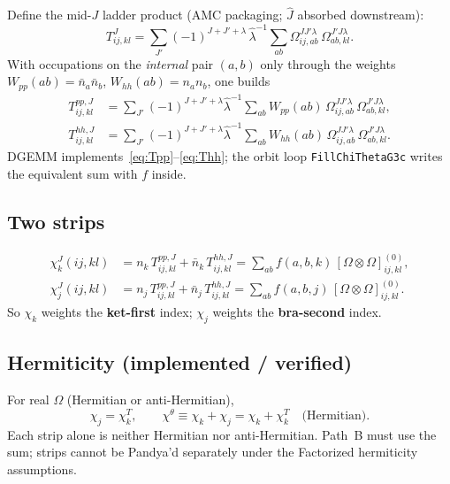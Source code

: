 \documentclass[11pt]{article}
\newcommand{\Jhat}[1]{\widehat{#1}}
\newcommand{\nbar}{\bar n}
\begin{document}
Define the mid-$J$ ladder product (AMC packaging; $\Jhat{J}$ absorbed downstream):
\begin{equation}
T^{J}_{ij,kl}
=\sum_{J'}(-1)^{J+J'+\lambda}\,\hat\lambda^{-1}
\sum_{ab}
\Omega^{JJ'\lambda}_{ij,ab}\,
\Omega^{J'J\lambda}_{ab,kl}.
\label{eq:T}
\end{equation}
With occupations on the \emph{internal} pair $(a,b)$ only through the weights
$W_{pp}(ab)=\nbar_a\nbar_b$, $W_{hh}(ab)=n_a n_b$, one builds
\begin{align}
T^{pp,J}_{ij,kl}
&=\sum_{J'}(-1)^{J+J'+\lambda}\hat\lambda^{-1}
\sum_{ab} W_{pp}(ab)\,
\Omega^{JJ'\lambda}_{ij,ab}\,\Omega^{J'J\lambda}_{ab,kl},
\label{eq:Tpp}\\
T^{hh,J}_{ij,kl}
&=\sum_{J'}(-1)^{J+J'+\lambda}\hat\lambda^{-1}
\sum_{ab} W_{hh}(ab)\,
\Omega^{JJ'\lambda}_{ij,ab}\,\Omega^{J'J\lambda}_{ab,kl}.
\label{eq:Thh}
\end{align}
DGEMM implements~\eqref{eq:Tpp}--\eqref{eq:Thh}; the orbit loop
\texttt{FillChiThetaG3c} writes the equivalent sum with $f$ inside.

\subsection{Two strips}
\begin{align}
\chi_k^{J}(ij,kl)
&= n_k\,T^{pp,J}_{ij,kl} + \nbar_k\,T^{hh,J}_{ij,kl}
=\sum_{ab} f(a,b,k)\,[\Omega\otimes\Omega]^{(0)}_{ij,kl},
\label{eq:chik}\\
\chi_j^{J}(ij,kl)
&= n_j\,T^{pp,J}_{ij,kl} + \nbar_j\,T^{hh,J}_{ij,kl}
=\sum_{ab} f(a,b,j)\,[\Omega\otimes\Omega]^{(0)}_{ij,kl}.
\label{eq:chij}
\end{align}
So $\chi_k$ weights the \textbf{ket-first} index; $\chi_j$ weights the
\textbf{bra-second} index.

\subsection{Hermiticity (implemented / verified)}
For real $\Omega$ (Hermitian or anti-Hermitian),
\begin{equation}
\chi_j = \chi_k^{T},
\qquad
\chi^\theta \equiv \chi_k+\chi_j = \chi_k+\chi_k^{T}
\quad\text{(Hermitian)}.
\label{eq:chi-herm}
\end{equation}
Each strip alone is neither Hermitian nor anti-Hermitian.
Path~B must use the sum; strips cannot be Pandya'd separately under the
Factorized hermiticity assumptions.

\end{document}
